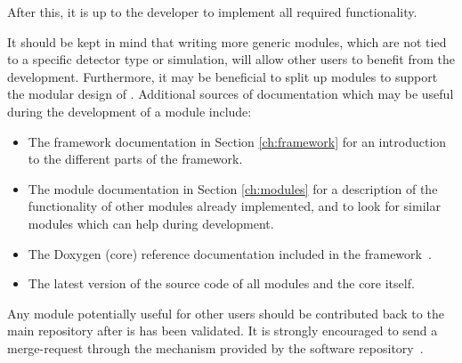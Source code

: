 After this, it is up to the developer to implement all required functionality.

It should be kept in mind that writing more generic modules, which are not tied to a specific detector type or simulation, will allow other users to benefit from the development.
Furthermore, it may be beneficial to split up modules to support the modular design of \apsq.
Additional sources of documentation which may be useful during the development of a module include:
\begin{itemize}
\item The framework documentation in Section \ref{ch:framework} for an introduction to the different parts of the framework.
\item The module documentation in Section \ref{ch:modules} for a description of the functionality of other modules already implemented, and to look for similar modules which can help during development.
\item The Doxygen (core) reference documentation included in the framework~\cite{ap2-doxygen}.
\item The latest version of the source code of all modules and the \apsq core itself.
\end{itemize}

Any module potentially useful for other users should be contributed back to the main repository after is has been validated.
It is strongly encouraged to send a merge-request through the mechanism provided by the software repository~\cite{ap2-repo}.

